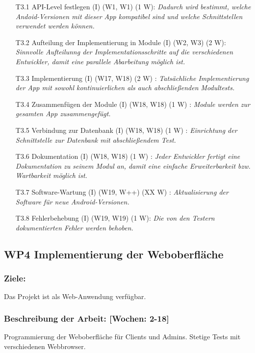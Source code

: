 \documentclass{scrreprt}
\begin{document}
\begin{enumerate}
\item [T3.1] API-Level festlegen (I) (W1, W1) (1 W): \emph{ Dadurch wird bestimmt, welche Andoid-Versionen mit dieser App kompatibel sind und welche Schnittstellen verwendet werden können.}
\item [T3.2] Aufteilung der Implementierung in Module (I) (W2, W3) (2 W): \emph{ Sinnvolle Aufteilunng der Implementationsschritte auf die verschiedenen Entwickler, damit eine parallele Abarbeitung möglich ist.}
\item [T3.3] Implementierung (I) (W17, W18) (2 W) : \emph{ Tatsächliche Implementierung der App mit sowohl kontinuierlichen als auch abschließenden Modultests.}
\item [T3.4] Zusammenfügen der Module (I) (W18, W18) (1 W) : \emph{ Module werden zur gesamten App zusammengefügt.}
\item [T3.5] Verbindung zur Datenbank (I) (W18, W18) (1 W) : \emph{ Einrichtung der Schnittstelle zur Datenbank mit abschließendem Test.}
\item [T3.6] Dokumentation (I) (W18, W18) (1 W) : \emph{ Jeder Entwickler fertigt eine Dokumentation zu seinem Modul an, damit eine einfache Erweiterbarkeit bzw. Wartbarkeit möglich ist.}
\item [T3.7] Software-Wartung (I) (W19, W++) (XX W) : \emph{ Aktualisierung der Software für neue Android-Versionen.}
\item [T3.8] Fehlerbehebung (I) (W19, W19) (1 W): \emph{Die von den Testern dokumentierten Fehler werden behoben.}
\end{enumerate}

\subsection*{WP4 Implementierung der Weboberfläche}

\subsubsection{Ziele:} Das Projekt ist als Web-Anwendung verfügbar.
\subsubsection{Beschreibung der Arbeit: [Wochen: 2-18]} Programmierung der Weboberfläche für Clients und Admins. Stetige Tests mit verschiedenen Webbrowser.
\end{document}
